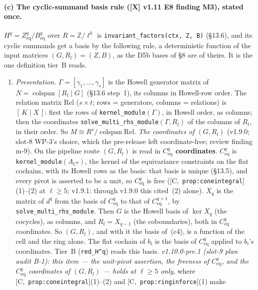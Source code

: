 \documentclass[11pt]{article}
\theoremstyle{remark}
\newcommand{\Z}{\mathbb{Z}}
\newcommand{\HA}[1]{[C,~\texttt{#1}]}      %
\begin{document}
\paragraph{(c) The cyclic-summand basis rule ([X] v1.11 E8 finding M3), stated once.}
$H^q=Z^q_{\mathrm{eq}}/B^q_{\mathrm{eq}}$ over $R=\Z/\ell^k$ is \texttt{invariant\_factors(ctx, Z,
B)} (\S13.6), and its cyclic summands get a basis by the following rule, a deterministic function
of the input matrices $(G,R_l)=(Z,B)$, as the D5b bases of \S8 are of theirs. It is the one
definition tier~B reads.
\begin{enumerate}[label=(c\arabic*)]
\item \emph{Presentation.} $\Gamma=[\gamma_1,\dots,\gamma_s]$ is the Howell generator matrix of
  $N=\operatorname{colspan}[R_l\mid G]$ (\S13.6 step~1), its columns in Howell-row order. The
  relation matrix $\mathrm{Rel}$ ($s\times t$; rows = generators, columns = relations) is
  $[\,K\mid X\,]$: first the rows of \texttt{kernel\_module}$(\Gamma)$, in Howell order, as
  columns; then the coordinates \texttt{solve\_multi\_rhs\_module}$(\Gamma,R_l)$ of the columns of
  $R_l$, in their order. So $M\cong R^s/\operatorname{colspan}\mathrm{Rel}$.
  \emph{The coordinates of $(G,R_l)$} (v1.9.0; slot-8 WP-3's choice, which the pre-release left
  coordinate-free; review finding m-9). On the pipeline route $(G,R_l)$ is read in
  \textbf{$C^q_{\mathrm{eq}}$ coordinates}. $C^q_{\mathrm{eq}}$ is
  \texttt{kernel\_module}$(A_{C^q})$, the kernel of the equivariance constraints on the flat
  cochains, with its Howell rows as the basis: that basis is unique (\S13.5), and every pivot is
  asserted to be a unit, so $C^q_{\mathrm{eq}}$ is free (\HA{prop:coneintegral}(1)--(2) at
  $\ell\ge5$; v1.9.1: through v1.9.0 this cited~(2) alone).
  $X_q$ is the matrix of $d^q$ from the basis of $C^q_{\mathrm{eq}}$ to that of
  $C^{q+1}_{\mathrm{eq}}$, by \texttt{solve\_multi\_rhs\_module}. Then $G$ is the Howell basis of
  $\ker X_q$ (the cocycles), as columns, and $R_l=X_{q-1}$ (the coboundaries), both in
  $C^q_{\mathrm{eq}}$ coordinates. So $(G,R_l)$, and with it the basis of~(c4), is a function of
  the cell and the ring alone. The flat cochain of $b_i$ is the basis of $C^q_{\mathrm{eq}}$
  applied to $b_i$'s coordinates. Tier~B (\texttt{red\_H\textasciicircum q}) reads this basis.
  \emph{v1.10.0-pre.1 (slot-9 plan audit B-1): this item --- the unit-pivot assertion, the
  freeness of $C^q_{\mathrm{eq}}$, and the $C^q_{\mathrm{eq}}$ coordinates of $(G,R_l)$ --- holds
  at $\ell\ge5$ only}, where \HA{prop:coneintegral}(1)--(2) and \HA{prop:ringinforce}(1) make

\end{enumerate}
\end{document}
